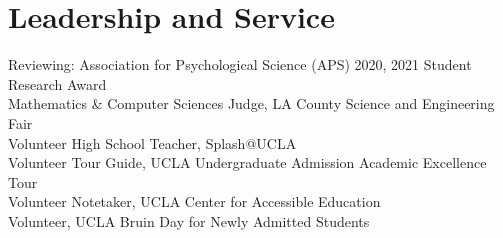 \section*{Leadership and Service}
Reviewing: Association for Psychological Science (APS) 2020, 2021 Student Research Award\\

Mathematics \& Computer Sciences Judge, LA County Science and Engineering Fair\\
Volunteer High School Teacher, Splash@UCLA\\
Volunteer Tour Guide, UCLA Undergraduate Admission Academic Excellence Tour\\
Volunteer Notetaker, UCLA Center for Accessible Education\\
Volunteer, UCLA Bruin Day for Newly Admitted Students